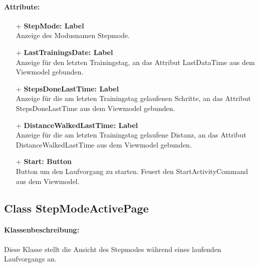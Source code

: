 \documentclass[a4paper,12pt]{article}
\begin{document}
\paragraph{Attribute:}
	\begin{itemize}
	\item[+] \textbf{StepMode: Label} \\ Anzeige des Modusnamen Stepmode.
	\item[+] \textbf{LastTrainingsDate: Label} \\ Anzeige für den letzten Trainingstag, an das Attribut LastDataTime aus dem Viewmodel gebunden.
	\item[+] \textbf{StepsDoneLastTime: Label} \\ Anzeige für die am letzten Trainingstag gelaufenen Schritte, an das Attribut StepsDoneLastTime aus dem Viewmodel gebunden.
	\item[+] \textbf{DistanceWalkedLastTime: Label} \\ Anzeige für die am letzten Trainingstag gelaufene Distanz, an das Attribut DistanceWalkedLastTime aus dem Viewmodel gebunden. 
	\item[+] \textbf{Start: Button} \\ Button um den Laufvorgang zu starten. Feuert den StartActivityCommand aus dem Viewmodel.
	\end{itemize}

\subsection{Class StepModeActivePage}
\paragraph{Klassenbeschreibung:}
Diese Klasse stellt die Ansicht des Stepmodes während eines laufenden Laufvorgangs an.
\end{document}
